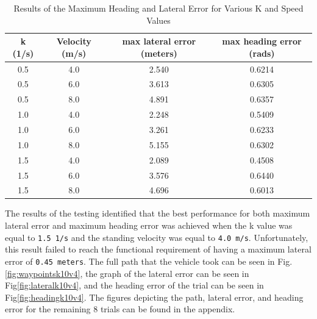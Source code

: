 \documentclass[titlepage,draft]{article}
\begin{document}
{\begin{table}
	\centering
	\begin{tabular}{| c | c | c | c |}
		\hline
		k (1/s) & Velocity (m/s) & max lateral error (meters) & max heading error (rads) \\ [0.5ex]
		\hline
		0.5     & 4.0            & 2.540                      & 0.6214                   \\
		\hline
		0.5     & 6.0            & 3.613                      & 0.6305                   \\
		\hline
		0.5     & 8.0            & 4.891                      & 0.6357                   \\
		\hline
		1.0     & 4.0            & 2.248                      & 0.5409                   \\
		\hline
		1.0     & 6.0            & 3.261                      & 0.6233                   \\
		\hline
		1.0     & 8.0            & 5.155                      & 0.6302                   \\
		\hline
		1.5     & 4.0            & 2.089                      & 0.4508                   \\
		\hline
		1.5     & 6.0            & 3.576                      & 0.6440                   \\
		\hline
		1.5     & 8.0            & 4.696                      & 0.6013                   \\
		\hline
	\end{tabular}
	\caption{Results of the Maximum Heading and Lateral Error for Various K and Speed Values}
	\label{tab:controller_test_values}
\end{table}

The results of the testing identified that the best performance for both maximum lateral error and maximum heading error was achieved when the k value was equal to \texttt{1.5 1/s} and the standing velocity was equal to \texttt{4.0 m/s}. Unfortunately, this result failed to reach the functional requirement of having a maximum lateral error of \texttt{0.45 meters}. The full path that the vehicle took can be seen in Fig.\ref{fig:waypointsk10v4}, the graph of the lateral error can be seen in Fig\ref{fig:lateralk10v4}, and the heading error of the trial can be seen in Fig\ref{fig:headingk10v4}. The figures depicting the path, lateral error, and heading error for the remaining 8 trials can be found in the appendix.

}
\end{document}
